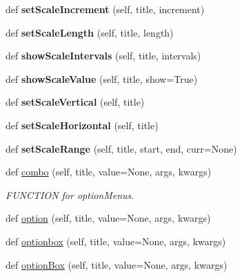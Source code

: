\begin{DoxyCompactItemize}
def {\bfseries set\+Scale\+Increment} (self, title, increment)
\item 
\mbox{\label{class_python_01_g_u_i_1_1appjar_1_1gui_a10db6c38086b1bf3780eba3151d8c6b3}} 
def {\bfseries set\+Scale\+Length} (self, title, length)
\item 
\mbox{\label{class_python_01_g_u_i_1_1appjar_1_1gui_aba916b07aa805510309b1185c71af183}} 
def {\bfseries show\+Scale\+Intervals} (self, title, intervals)
\item 
\mbox{\label{class_python_01_g_u_i_1_1appjar_1_1gui_abc7ab9af848f67b4ca3ee70aee36768d}} 
def {\bfseries show\+Scale\+Value} (self, title, show=True)
\item 
\mbox{\label{class_python_01_g_u_i_1_1appjar_1_1gui_ad2e09efbce70a3188c7e62083e2af559}} 
def {\bfseries set\+Scale\+Vertical} (self, title)
\item 
\mbox{\label{class_python_01_g_u_i_1_1appjar_1_1gui_a546f9e19e28462afb126f96cbc9237f0}} 
def {\bfseries set\+Scale\+Horizontal} (self, title)
\item 
\mbox{\label{class_python_01_g_u_i_1_1appjar_1_1gui_a72bc5ac4d5ac8d925921e89c79cdec60}} 
def {\bfseries set\+Scale\+Range} (self, title, start, end, curr=None)
\item 
def \hyperlink{class_python_01_g_u_i_1_1appjar_1_1gui_af92da83c8d10b81b590425a0a8fbffcb}{combo} (self, title, value=None, args, kwargs)
\begin{DoxyCompactList}\small\item\em F\+U\+N\+C\+T\+I\+ON for option\+Menus. \end{DoxyCompactList}\item 
def \hyperlink{class_python_01_g_u_i_1_1appjar_1_1gui_a146e85757fb347d225d2a0087c3edeae}{option} (self, title, value=None, args, kwargs)
\item 
def \hyperlink{class_python_01_g_u_i_1_1appjar_1_1gui_afd6b42cfd9bb3436be95fb948bfc4b8c}{optionbox} (self, title, value=None, args, kwargs)
\item 
def \hyperlink{class_python_01_g_u_i_1_1appjar_1_1gui_aad650f8b6e6d227317d39f03109f0e70}{option\+Box} (self, title, value=None, args, kwargs)

\end{DoxyCompactItemize}
